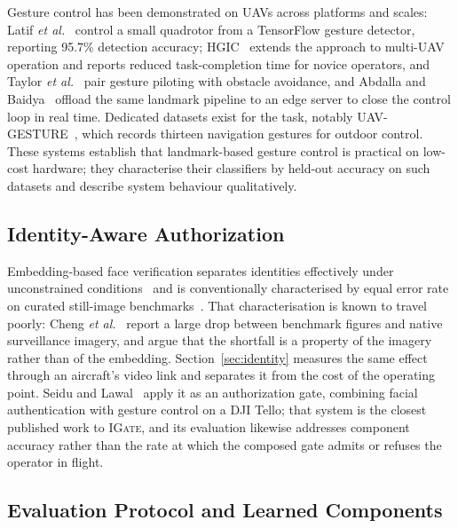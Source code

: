 \documentclass[conference]{IEEEtran}
\newcommand{\method}[1]{\textsc{#1}}
\begin{document}
Gesture control has been demonstrated on UAVs across platforms and scales:
Latif \emph{et al.}~\cite{latif2022} control a small quadrotor from a
TensorFlow gesture detector, reporting 95.7\% detection accuracy;
HGIC~\cite{hu2024hgic} extends the approach to multi-UAV
operation and reports reduced task-completion time for novice operators, and
Taylor \emph{et al.}~\cite{taylor2025} pair gesture piloting with obstacle
avoidance, and Abdalla and Baidya~\cite{abdalla2025edge} offload the same
landmark pipeline to an edge server to close the control loop in real time.
Dedicated datasets exist for the task, notably
\mbox{UAV-GESTURE}~\cite{perera2018uavgesture}, which records thirteen
navigation gestures for outdoor control. These systems establish that
landmark-based gesture control is practical on low-cost hardware; they
characterise their classifiers by held-out accuracy on such datasets and
describe system behaviour qualitatively.

\subsection{Identity-Aware Authorization}

Embedding-based face verification separates identities effectively under
unconstrained conditions~\cite{schroff2015,deng2019} and is conventionally
characterised by equal error rate on curated still-image
benchmarks~\cite{huang2008}. That characterisation is known to travel poorly:
Cheng \emph{et al.}~\cite{cheng2018survface} report a large drop between
benchmark figures and native surveillance imagery, and argue that the shortfall
is a property of the imagery rather than of the embedding.
Section~\ref{sec:identity} measures the same effect through an aircraft's video
link and separates it from the cost of the operating point. Seidu and Lawal~\cite{seidu2024} apply it as an
authorization gate, combining facial authentication with gesture control on a DJI
Tello; that system is the closest published work to \method{IGate}, and its
evaluation likewise addresses component accuracy rather than the rate at which
the composed gate admits or refuses the operator in flight.

\subsection{Evaluation Protocol and Learned Components}
\end{document}
